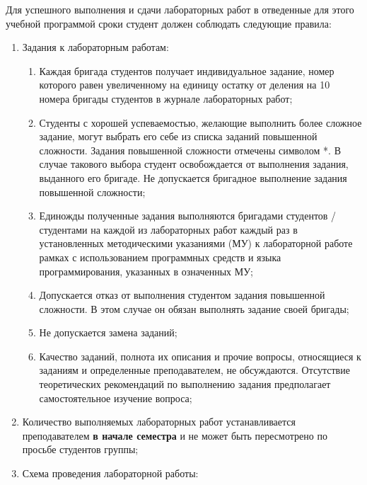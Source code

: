 
Для успешного выполнения и сдачи лабораторных работ в отведенные для этого учебной программой сроки студент должен соблюдать следующие правила:

\begin{enumerate}

	\item Задания к лабораторным работам:

	\begin{enumerate}
		
		\item Каждая бригада студентов получает индивидуальное задание, номер которого равен увеличенному на единицу остатку от деления на 10 номера бригады студентов в журнале лабораторных работ;
		\item Студенты с хорошей успеваемостью, желающие выполнить более сложное задание, могут выбрать его себе из списка заданий повышенной сложности. Задания повышенной сложности отмечены символом *. В случае такового выбора студент освобождается от выполнения задания, выданного его бригаде. Не допускается бригадное выполнение задания повышенной сложности;
		\item Единожды полученные задания выполняются бригадами студентов / студентами на каждой из лабораторных работ каждый раз в установленных методическими указаниями (МУ) к лабораторной работе рамках с использованием программных средств и языка программирования, указанных в означенных МУ;
		\item Допускается отказ от выполнения студентом задания повышенной сложности. В этом случае он обязан выполнять задание своей бригады;
		\item Не допускается замена заданий;
		\item Качество заданий, полнота их описания и прочие вопросы, относящиеся к заданиям и определенные преподавателем, не обсуждаются. Отсутствие теоретических рекомендаций по выполнению задания предполагает самостоятельное изучение вопроса;

	\end{enumerate}

	\item Количество выполняемых лабораторных работ устанавливается преподавателем {\bf в начале семестра} и не может быть пересмотрено по просьбе студентов группы;

	\item Схема проведения лабораторной работы:

	\begin{enumerate}


\end{enumerate}
\end{enumerate}

